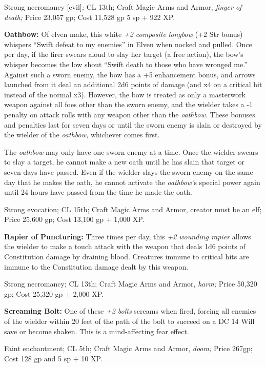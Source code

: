 \documentclass{article}
\begin{document}
Strong necromancy [evil]\textit{; }CL 13th; Craft Magic Arms and Armor, \textit{finger 
of death; }Price 23,057 gp; Cost 11,528 gp 5 sp + 922 XP.

\textbf{Oathbow:} Of elven make, this white \textit{+2 composite longbow }(+2 Str 
bonus) whispers ``Swift defeat to my enemies'' in Elven when nocked and pulled. 
Once per day, if the firer swears aloud to slay her target (a free action), the 
bow's whisper becomes the low shout ``Swift death to those who have wronged me.'' 
Against such a sworn enemy, the bow has a +5 enhancement bonus, and arrows launched 
from it deal an additional 2d6 points of damage (and x4 on a critical hit instead 
of the normal x3). However, the bow is treated as only a masterwork weapon against 
all foes other than the sworn enemy, and the wielder takes a -1 penalty on attack 
rolls with any weapon other than the \textit{oathbow. }These bonuses and penalties 
last for seven days or until the sworn enemy is slain or destroyed by the wielder 
of the \textit{oathbow, }whichever comes first.

The \textit{oathbow }may only have one sworn enemy at a time. Once the wielder 
swears to slay a target, he cannot make a new oath until he has slain that target 
or seven days have passed. Even if the wielder slays the sworn enemy on the same 
day that he makes the oath, he cannot activate the \textit{oathbow'}s special power 
again until 24 hours have passed from the time he made the oath.

Strong evocation; CL 15th; Craft Magic Arms and Armor, creator must be an elf; 
Price 25,600 gp; Cost 13,100 gp + 1,000 XP.

\textbf{Rapier of Puncturing: }Three times per day, this \textit{+2 wounding rapier 
}allows the wielder to make a touch attack with the weapon that deals 1d6 points 
of Constitution damage by draining blood. Creatures immune to critical hits are 
immune to the Constitution damage dealt by this weapon.

Strong necromancy; CL 13th; Craft Magic Arms and Armor, \textit{harm; }Price 50,320 
gp; Cost 25,320 gp + 2,000 XP.

\textbf{Screaming Bolt:} One of these \textit{+2 bolts }screams when fired, forcing 
all enemies of the wielder within 20 feet of the path of the bolt to succeed on 
a DC 14 Will save or become shaken. This is a mind-affecting fear effect.

Faint enchantment; CL 5th; Craft Magic Arms and Armor, \textit{doom; }Price 267gp; 
Cost 128 gp and 5 sp + 10 XP.
\end{document}

